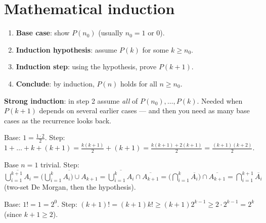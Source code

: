 \documentclass{fkt-notes}
\newcommand{\src}[1]{\par\noindent{\small\itshape Source: #1}\par\smallskip}
\newcommand{\kolman}[1]{\setcounter{section}{\numexpr#1-1\relax}}
\theoremstyle{definition}
\begin{document}
\kolman{4}
\section{Mathematical induction}\src{Kolman 2.4}\label{qg:induct}
%

\begin{keybox}[title={Template (same shape as a recursive function: base case + recursive step)}]
  \begin{enumerate}[label=\arabic*.,leftmargin=*]
    \item \textbf{Base case}: show $P(n_0)$ (usually $n_0=1$ or $0$).
    \item \textbf{Induction hypothesis}: assume $P(k)$ for some $k\ge n_0$.
    \item \textbf{Induction step}: using the hypothesis, prove $P(k+1)$.
    \item \textbf{Conclude}: by induction, $P(n)$ holds for all $n\ge n_0$.
  \end{enumerate}
  \textbf{Strong induction}: in step 2 assume \emph{all} of
  $P(n_0),\dots,P(k)$. Needed when $P(k+1)$ depends on several earlier
  cases --- and then you need as many base cases as the recurrence looks
  back.
\end{keybox}

\begin{example}[2.4 Ex.~1: $1+2+\dots+n=\frac{n(n+1)}{2}$]
  Base: $1=\frac{1\cdot2}{2}$. Step:
  $1+\dots+k+(k+1)=\frac{k(k+1)}{2}+(k+1)=\frac{k(k+1)+2(k+1)}{2}
    =\frac{(k+1)(k+2)}{2}$.
\end{example}

\begin{example}[2.4 Ex.~2: De Morgan for $n$ sets,
    $\overline{\bigcup_{i=1}^{n}A_i}=\bigcap_{i=1}^{n}\overline{A_i}$]
  Base $n=1$ trivial. Step:
  $\overline{\bigcup_{i=1}^{k+1}A_i}
    =\overline{\bigl(\bigcup_{i=1}^{k}A_i\bigr)\cup A_{k+1}}
    =\overline{\bigcup_{i=1}^{k}A_i}\cap\overline{A_{k+1}}
    =\bigl(\bigcap_{i=1}^{k}\overline{A_i}\bigr)\cap\overline{A_{k+1}}
    =\bigcap_{i=1}^{k+1}\overline{A_i}$
  (two-set De Morgan, then the hypothesis).
\end{example}

\begin{example}[2.4 Ex.~4: $n!\ge2^{n-1}$]
  Base: $1!=1=2^0$. Step: $(k+1)!=(k+1)k!\ge(k+1)2^{k-1}\ge2\cdot2^{k-1}=2^k$
  (since $k+1\ge2$).
\end{example}
\end{document}
